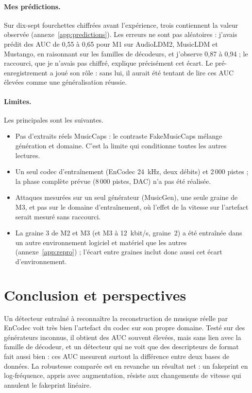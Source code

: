 \documentclass[a4paper, 11pt]{article}
\begin{document}
\paragraph{Mes prédictions.} Sur dix-sept fourchettes chiffrées avant l'expérience, trois contiennent la
valeur observée (annexe~\ref{app:predictions}). Les erreurs ne sont pas aléatoires : j'avais prédit des
AUC de 0,55 à 0,65 pour M1 sur AudioLDM2, MusicLDM et Mustango, en raisonnant sur les familles de
décodeurs, et j'observe 0,87 à 0,94 ; le raccourci, que je n'avais pas chiffré, explique précisément cet
écart. Le pré-enregistrement a joué son rôle : sans lui, il aurait été tentant de lire ces AUC élevées
comme une généralisation réussie.

\paragraph{Limites.} Les principales sont les suivantes.
\begin{itemize}
    \item Pas d'extraits réels MusicCaps : le contraste FakeMusicCaps mélange génération et domaine. C'est
    la limite qui conditionne toutes les autres lectures.
    \item Un seul codec d'entraînement (EnCodec 24~kHz, deux débits) et 2\,000 pistes ; la phase complète
    prévue (8\,000 pistes, DAC) n'a pas été réalisée.
    \item Attaques mesurées sur un seul générateur (MusicGen), une seule graine de M3, et pas sur le domaine
    d'entraînement, où l'effet de la vitesse sur l'artefact serait mesuré sans raccourci.
    \item La graine 3 de M2 et M3 (et M3 à 12~kbit/s, graine~2) a été entraînée dans un autre environnement
    logiciel et matériel que les autres (annexe~\ref{app:repro}) ; l'écart entre graines inclut donc aussi
    cet écart d'environnement.
\end{itemize}

\section{Conclusion et perspectives}

Un détecteur entraîné à reconnaître la reconstruction de musique réelle par EnCodec voit très bien
l'artefact du codec sur son propre domaine. Testé sur des générateurs inconnus, il obtient des AUC
souvent élevées, mais sans lien avec la famille de décodeur, et un détecteur qui ne voit que des
descripteurs de format fait aussi bien : ces AUC mesurent surtout la différence entre deux bases de
données. La robustesse comparée est en revanche un résultat net : un fakeprint en log-fréquence, appris
avec augmentation, résiste aux changements de vitesse qui annulent le fakeprint linéaire.
\end{document}
